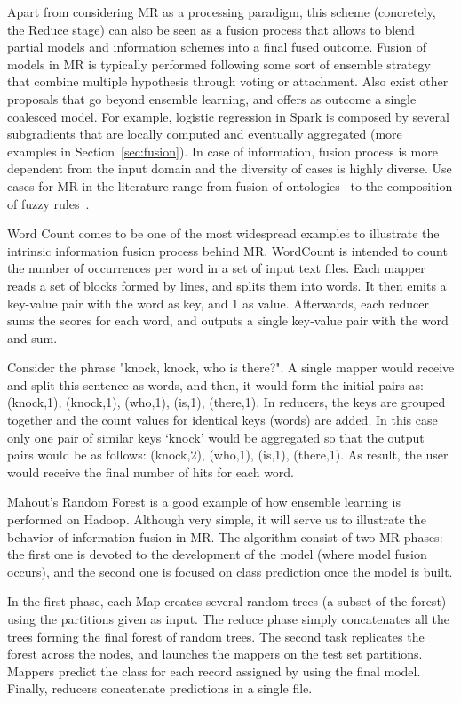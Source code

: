 \documentclass[3p,review]{elsarticle}
\begin{document}
Apart from considering MR as a processing paradigm, this scheme (concretely, the Reduce stage) can also be seen as a fusion process that allows to blend partial models and information schemes into a final fused outcome. Fusion of models in MR is typically performed following some sort of ensemble strategy that combine multiple hypothesis through voting or attachment. Also exist other proposals that go beyond ensemble learning, and offers as outcome a single coalesced model. For example, logistic regression in Spark is composed by several subgradients that are locally computed and eventually aggregated (more examples in Section~\ref{sec:fusion}). In case of information, fusion process is more dependent from the input domain and the diversity of cases is highly diverse. Use cases for MR in the literature range from fusion of ontologies~\cite{zhang14b} to the composition of fuzzy rules~\cite{rio15b}.

Word Count comes to be one of the most widespread examples to illustrate the intrinsic information fusion process behind MR. WordCount is intended to count the number of occurrences per word in a set of input text files. Each mapper reads a set of blocks formed by lines, and splits them into words. It then emits a key-value pair with the word as key, and 1 as value. Afterwards, each reducer sums the scores for each word, and outputs a single key-value pair with the word and sum. 

Consider the phrase "knock, knock, who is there?". A single mapper would receive and split this sentence as words, and then, it would form the initial pairs as: (knock,1), (knock,1), (who,1), (is,1), (there,1). In reducers, the keys are grouped together and the count values for identical keys (words) are added. In this case only one pair of similar keys `knock' would be aggregated so that the output pairs would be as follows: (knock,2), (who,1), (is,1), (there,1). As result, the user would receive the final number of hits for each word. 

Mahout's Random Forest is a good example of how ensemble learning is performed on Hadoop. Although very simple, it will serve us to illustrate the behavior of information fusion in MR. The algorithm consist of two MR phases: the first one is devoted to the development of the model (where model fusion occurs), and the second one is focused on class prediction once the model is built.

In the first phase, each Map creates several random trees (a subset of the forest) using the partitions given as input. The reduce phase simply concatenates all the trees forming the final forest of random trees. The second task replicates the forest across the nodes, and launches the mappers on the test set partitions. Mappers predict the class for each record assigned by using the final model. Finally, reducers concatenate predictions in a single file.
\end{document}
